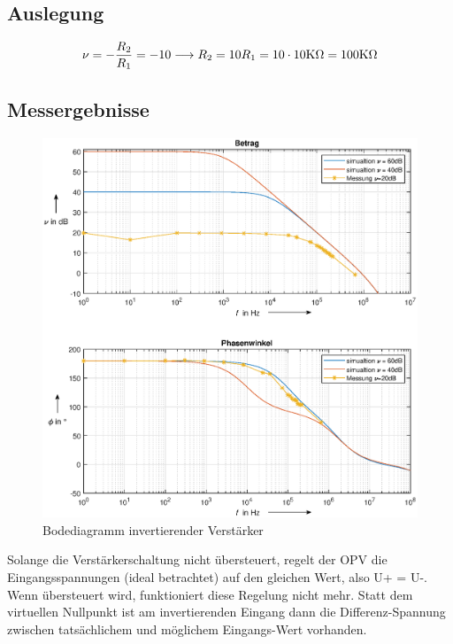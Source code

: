 \subsection{Auslegung}
\begin{align}
    \nu = -\frac{R_2}{R_1} =-10 \longrightarrow R_2 = 10R_1=10\cdot 10\text{K}\Omega =100\text{K}\Omega
\end{align}
\subsection{Messergebnisse}
\begin{figure}[H]
    \centering
    \includegraphics[width=\costumPicWidth]{Lab_1/Plots/inv_verst.eps}
    \caption{Bodediagramm invertierender Verstärker}
    \label{fig:bode_inv_verst}
\end{figure}

Solange die Verstärkerschaltung nicht übersteuert, regelt der OPV die Eingangsspannungen (ideal betrachtet) auf
den gleichen Wert, also U+ = U-. Wenn übersteuert wird, funktioniert diese Regelung nicht mehr. Statt dem
virtuellen Nullpunkt ist am invertierenden Eingang dann die Differenz-Spannung zwischen tatsächlichem und
möglichem Eingangs-Wert vorhanden.
